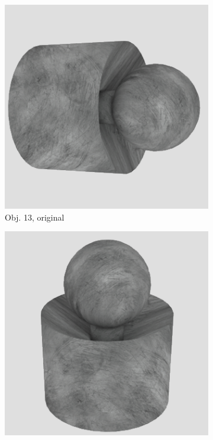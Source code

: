 \begin{figure}
\medskip
\begin{subfigure}{0.2\textwidth}
\includegraphics[width=\linewidth]{Bilder/Objekt13A.png}
\caption{Obj. 13, original} \label{fig:c}
\end{subfigure}\hspace{.5cm} %
\begin{subfigure}{0.2\textwidth}
\includegraphics[width=\linewidth]{Bilder/Objekt13B.png}

\end{subfigure}
\end{figure}
